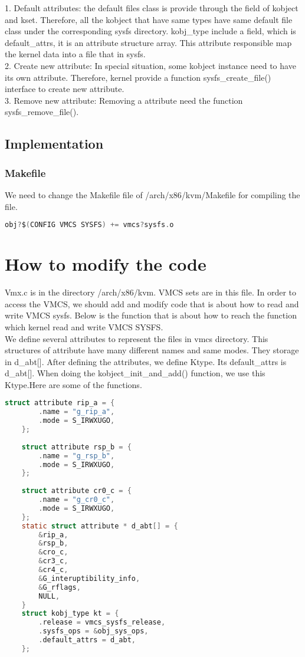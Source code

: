 \documentclass[10pt,draftclsnofoot,peerreview ,letterpaper,onecolumn,]{IEEEtran}
\begin{document}
		1. Default attributes: the default files class is provide through the field of kobject and kset. Therefore, all the kobject that have same types have same default file class under the corresponding sysfs directory. kobj\_type include a field, which is default\_attrs, it is an attribute structure array. This attribute responsible map the kernel data into a file that in sysfs.\\
		2. Create new attribute: In special situation, some kobject instance need to have its own attribute. Therefore, kernel provide a function sysfs\_create\_file() interface to create new attribute.\\
	    3. Remove new attribute: Removing a attribute need the function sysfs\_remove\_file().\\

	\subsection{Implementation}
	\subsubsection{Makefile}
	 We need to change the Makefile file of /arch/x86/kvm/Makefile for compiling the file.
	 
	\begin{lstlisting}[language=C]
	obj?$(CONFIG VMCS SYSFS) += vmcs?sysfs.o 
 	\end{lstlisting}
	
	\newpage
	\section{How to modify the code}
	Vmx.c is in the directory /arch/x86/kvm. VMCS sets are in this file. In order to access the VMCS, we should add and modify code that is about how to read and write VMCS sysfs. Below is the function that is about how to reach the function which kernel read and write VMCS SYSFS. \\
	We define several attributes to represent the files in vmcs directory. This structures of attribute have many different names and same modes. They storage in d\_abt[]. After defining the attributes, we define Ktype. Its default\_attrs is d\_abt[]. When doing the kobject\_init\_and\_add() function, we use this Ktype.\newline Here are some of the functions.
	\begin{lstlisting}[language=C]
	struct attribute rip_a = {
		.name = "g_rip_a",
		.mode = S_IRWXUGO,
	};
	
	struct attribute rsp_b = {
		.name = "g_rsp_b",
		.mode = S_IRWXUGO,
	};
	
	struct attribute cr0_c = {
		.name = "g_cr0_c",
		.mode = S_IRWXUGO,
	};
	static struct attribute * d_abt[] = {
		&rip_a,
		&rsp_b,
		&cro_c,
		&cr3_c,
		&cr4_c,
		&G_interuptibility_info,
		&G_rflags,
		NULL,
	}
	struct kobj_type kt = {
		.release = vmcs_sysfs_release,
		.sysfs_ops = &obj_sys_ops,
		.default_attrs = d_abt,
	};
	\end{lstlisting}
	
\end{document}
